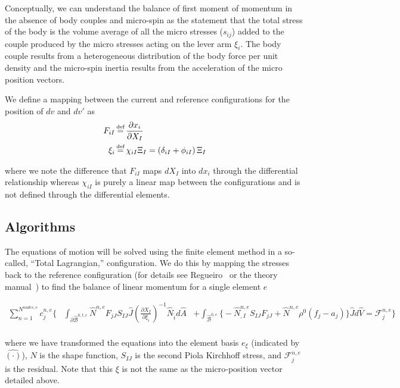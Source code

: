 Conceptually, we can understand the balance of first moment of momentum in the absence of body couples and micro-spin as the statement that the total stress of the body is the volume average of all the micro stresses ($s_{ij}$) added to the couple produced by the micro stresses acting on the lever arm $\xi_i$. The body couple results from a heterogeneous distribution of the body force per unit density and the micro-spin inertia results from the acceleration of the micro position vectors.

We define a mapping between the current and reference configurations for the position of $dv$ and $dv'$ as
\begin{align*}
F_{iI} &\defeq \frac{\partial x_i}{\partial X_I}\\
\xi_i  &\defeq \chi_{iI}\Xi_I = \left(\delta_{iI}+\phi_{iI}\right)\Xi_I\\
\end{align*}

where we note the difference that $F_{iI}$ maps $dX_I$ into $dx_i$ through the differential relationship whereas $\chi_{iI}$ is purely a linear map between the configurations and is not defined through the differential elements.

\subsection{Algorithms}

The equations of motion will be solved using the finite element method in a so-called, ``Total Lagrangian,'' configuration. We do this by mapping the stresses back to the reference configuration (for details see Regueiro~\cite{bib:regueiro_micro10} or the theory manual~\cite{bib:miller17}) to find the balance of linear momentum for a single element $e$

\begin{align*}
\sum_{n=1}^{N^{nodes,e}} c^{n,e}_j \bigg\{&\int_{\partial \hat{\mathcal{B}}^{0,t,e}} \hat{N}^{n,e} F_{jJ} S_{IJ} \hat{J} \left(\frac{\partial X_{I}}{\partial \xi_{\hat{i}}}\right)^{-1} \hat{N}_{\hat{i}} d\hat{A}& + \int_{\hat{\mathcal{B}}^{0,e}} \big\{- \hat{N}^{n,e}_{,I} S_{IJ} F_{jJ} + \hat{N}^{n,e} \rho^0 \left(f_j - a_j\right) \big\} \hat{J} d\hat{V} = \mathcal{F}_j^{n,e}\bigg\}\\
\end{align*}

where we have transformed the equations into the element basis $e_\xi$ (indicated by $\hat{\left(\cdot\right)}$), $N$ is the shape function, $S_{IJ}$ is the second Piola Kirchhoff stress, and $\mathcal{F}_j^{n,e}$ is the residual. Note that this $\xi$ is not the same as the micro-position vector detailed above.


